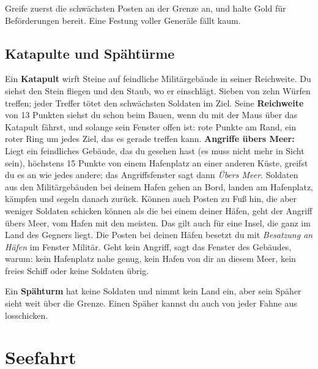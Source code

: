 \documentclass[a4paper,11pt,oneside,DIV=12,headings=small,toc=chapterentrydotfill]{scrbook}
\begin{document}
\begin{tipbox}Greife zuerst die schwächsten Posten an der Grenze an, und halte Gold für Beförderungen bereit.
Eine Festung voller Generäle fällt kaum.\end{tipbox}

\section{Katapulte und Spähtürme}
Ein \textbf{Katapult} wirft Steine auf feindliche Militärgebäude in seiner Reichweite. Du siehst den Stein
fliegen und den Staub, wo er einschlägt. Sieben von zehn Würfen treffen; jeder Treffer tötet den schwächsten
Soldaten im Ziel. Seine \textbf{Reichweite} von 13 Punkten siehst du schon beim Bauen, wenn du mit der Maus über
das Katapult fährst, und solange sein Fenster offen ist: rote Punkte am Rand, ein roter Ring um jedes Ziel, das
es gerade treffen kann. \textbf{Angriffe übers Meer:} Liegt ein feindliches Gebäude, das du gesehen hast (es muss nicht mehr in Sicht sein), höchstens 15 Punkte von einem Hafenplatz an einer
anderen Küste, greifst du es an wie jedes andere; das Angriffsfenster sagt dann \emph{Übers Meer}. Soldaten aus
den Militärgebäuden bei deinem Hafen gehen an Bord, landen am Hafenplatz, kämpfen und segeln danach zurück. Können
auch Posten zu Fuß hin, die aber weniger Soldaten schicken können als die bei einem deiner Häfen, geht der Angriff
übers Meer, vom Hafen mit den meisten.
Das gilt auch für eine Insel, die ganz im Land des Gegners liegt. Die Posten bei deinen Häfen besetzt du mit
\emph{Besatzung an Häfen} im Fenster Militär. Geht kein Angriff, sagt das Fenster des Gebäudes, warum: kein
Hafenplatz nahe genug, kein Hafen von dir an diesem Meer, kein freies Schiff oder keine Soldaten übrig.

Ein \textbf{Spähturm} hat keine Soldaten und nimmt kein Land ein, aber sein Späher sieht
weit über die Grenze. Einen Späher kannst du auch von jeder Fahne aus losschicken.

\chapter{Seefahrt}

\end{document}
